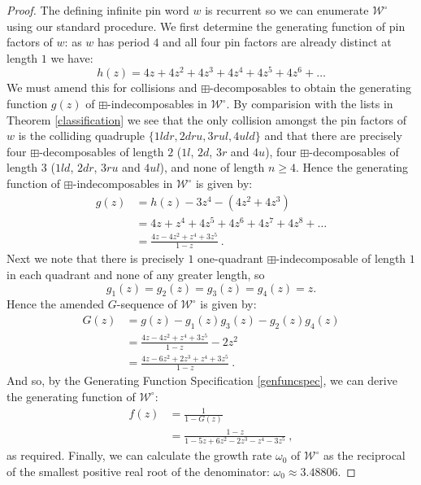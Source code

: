 \documentclass[11pt,a4paper]{article}
\theoremstyle{definition}
\begin{document}
\begin{proof}
The defining infinite pin word $w$ is recurrent so we can enumerate $\mathcal{W}^{\circ}$ using our standard procedure. We first determine the generating function of pin factors of $w$: as $w$ has period $4$ and all four pin factors are already distinct at length $1$ we have:
\[
h(z) = 4z + 4z^2 + 4z^3 + 4z^4 + 4z^5 + 4z^6 + \dots
\]
We must amend this for collisions and $\boxplus$-decomposables to obtain the generating function $g(z)$ of $\boxplus$-indecomposables in $\mathcal{W}^{\circ}$. By comparision with the lists in Theorem \ref{classification} we see that the only collision amongst the pin factors of $w$ is the colliding quadruple $\{1ldr, 2dru, 3rul, 4uld\}$ and that there are precisely four $\boxplus$-decomposables of length $2$ ($1l$, $2d$, $3r$ and $4u$), four $\boxplus$-decomposables of length $3$ ($1ld$, $2dr$, $3ru$ and $4ul$), and none of length $n \geq 4$. Hence the generating function of $\boxplus$-indecomposables in $\mathcal{W}^{\circ}$ is given by:
\[
\begin{split}
g(z) & = h(z) - 3z^4 - (4z^2 + 4z^3) \\
 & = 4z + z^4 + 4z^5 + 4z^6 + 4z^7 + 4z^8 + \dots \\
 & = \frac{4z - 4z^2 + z^4 + 3z^5}{1-z} \ .
\end{split}
\]
Next we note that there is precisely $1$ one-quadrant $\boxplus$-indecomposable of length $1$ in each quadrant and none of any greater length, so
\[
g_{1}(z) = g_{2}(z) = g_{3}(z) = g_{4}(z) = z.
\]
Hence the amended $G$-sequence of $\mathcal{W}^{\circ}$ is given by:
\[
\begin{split}
G(z) & = g(z) - g_{1}(z)g_{3}(z) - g_{2}(z)g_{4}(z) \\
 & = \frac{4z - 4z^2 + z^4 + 3z^5}{1-z} - 2z^2 \\
 & = \frac{4z - 6z^2 + 2z^3 + z^4 + 3z^5}{1-z} \ .
\end{split}
\]
And so, by the Generating Function Specification \ref{genfuncspec}, we can derive the generating function of $\mathcal{W}^{\circ}$:
\[
\begin{split}
f(z) & = \frac{1}{1 - G(z)} \\
 & = \frac{1-z}{1 - 5z + 6z^2 - 2z^3 - z^4 - 3z^5} \ ,
\end{split}
\]
as required. Finally, we can calculate the growth rate $\omega_{0}$ of $\mathcal{W}^{\circ}$ as the reciprocal of the smallest positive real root of the denominator: $\omega_{0} \approx 3.48806$. \end{proof}
\end{document}
